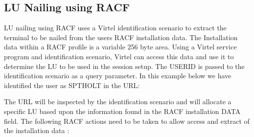 \documentclass[letterpaper,10pt,english]{sphinxmanual}
\begin{document}
\ignorespaces 

\subsection{LU Nailing using RACF}
\label{\detokenize{connectivity_guide:lu-nailing-using-racf}}\label{\detokenize{connectivity_guide:index-159}}
\sphinxAtStartPar
LU nailing using RACF uses a Virtel identification scenario to extract the terminal to be nailed from the users RACF installation data. The Installation data within a RACF profile is a variable 256 byte area. Using a Virtel service program and identification scenario, Virtel can access this data and use it to determine the LU to be used in the session setup. The USERID is passed to the identification scenario as a query parameter. In this example below we have identified the user as SPTHOLT in the URL: \sphinxhyphen{}

\sphinxAtStartPar
{}

\sphinxAtStartPar
The URL will be inspected by the identification scenario and will allocate a specific LU based upon the information found in the RACF installation DATA field. The following RACF actions need to be taken to allow access and extract of the installation data :\sphinxhyphen{}
\end{document}
